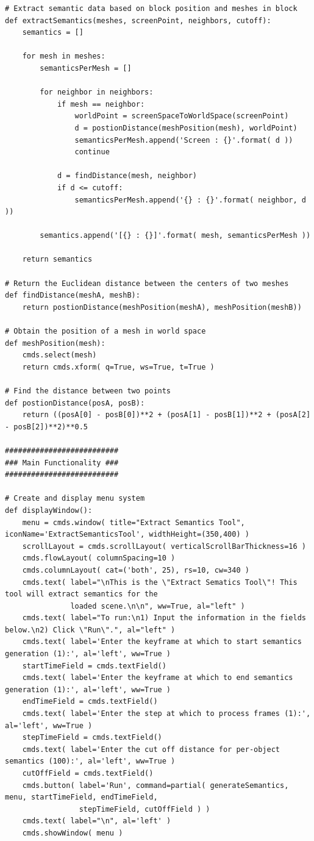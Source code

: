 \documentclass[conference]{IEEEtran}
\begin{document}
{{\begin{verbatim}
# Extract semantic data based on block position and meshes in block
def extractSemantics(meshes, screenPoint, neighbors, cutoff):
    semantics = []
    
    for mesh in meshes:
        semanticsPerMesh = []
        
        for neighbor in neighbors:
            if mesh == neighbor:
                worldPoint = screenSpaceToWorldSpace(screenPoint)
                d = postionDistance(meshPosition(mesh), worldPoint)
                semanticsPerMesh.append('Screen : {}'.format( d ))
                continue
                
            d = findDistance(mesh, neighbor)
            if d <= cutoff:
                semanticsPerMesh.append('{} : {}'.format( neighbor, d ))
        
        semantics.append('[{} : {}]'.format( mesh, semanticsPerMesh ))
                
    return semantics

# Return the Euclidean distance between the centers of two meshes
def findDistance(meshA, meshB):
    return postionDistance(meshPosition(meshA), meshPosition(meshB))

# Obtain the position of a mesh in world space
def meshPosition(mesh):
    cmds.select(mesh)
    return cmds.xform( q=True, ws=True, t=True )

# Find the distance between two points
def postionDistance(posA, posB):
    return ((posA[0] - posB[0])**2 + (posA[1] - posB[1])**2 + (posA[2] - posB[2])**2)**0.5

##########################
### Main Functionality ###
##########################

# Create and display menu system
def displayWindow():
    menu = cmds.window( title="Extract Semantics Tool", iconName='ExtractSemanticsTool', widthHeight=(350,400) )
    scrollLayout = cmds.scrollLayout( verticalScrollBarThickness=16 )
    cmds.flowLayout( columnSpacing=10 )
    cmds.columnLayout( cat=('both', 25), rs=10, cw=340 )
    cmds.text( label="\nThis is the \"Extract Sematics Tool\"! This tool will extract semantics for the
               loaded scene.\n\n", ww=True, al="left" )
    cmds.text( label="To run:\n1) Input the information in the fields below.\n2) Click \"Run\".", al="left" )
    cmds.text( label='Enter the keyframe at which to start semantics generation (1):', al='left', ww=True )
    startTimeField = cmds.textField()
    cmds.text( label='Enter the keyframe at which to end semantics generation (1):', al='left', ww=True )
    endTimeField = cmds.textField()
    cmds.text( label='Enter the step at which to process frames (1):', al='left', ww=True )
    stepTimeField = cmds.textField()
    cmds.text( label='Enter the cut off distance for per-object semantics (100):', al='left', ww=True )
    cutOffField = cmds.textField()
    cmds.button( label='Run', command=partial( generateSemantics, menu, startTimeField, endTimeField,
                 stepTimeField, cutOffField ) )
    cmds.text( label="\n", al='left' )
    cmds.showWindow( menu )


\end{verbatim}}}
\end{document}
